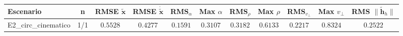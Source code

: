 \begin{tabular}{lcccccccccc}
\toprule
Escenario & n & RMSE $\tilde{\mathbf{x}}$ & RMSE $\dot{\tilde{\mathbf{x}}}$ & RMS$_\alpha$ & Max $\alpha$ & RMS$_\rho$ & Max $\rho$ & RMS$_{v_\perp}$ & Max $v_\perp$ & RMS $\|\tilde{\mathbf{h}}_h\|$ \\
\midrule
E2\_circ\_cinematico & 1/1 & $0.5528$ & $0.4277$ & $0.1591$ & $0.3107$ & $0.3182$ & $0.6133$ & $0.2217$ & $0.8324$ & $0.2522$ \\
\bottomrule
\end{tabular}
